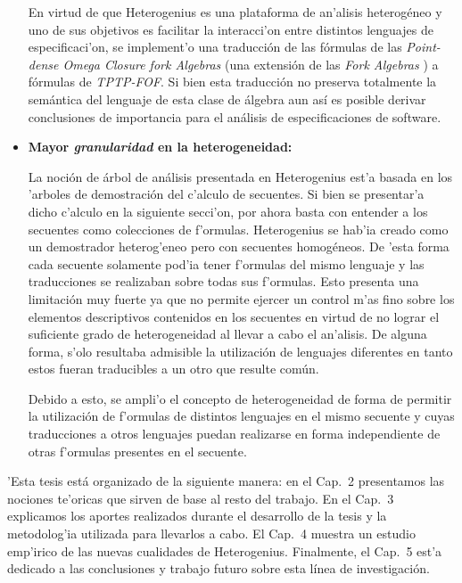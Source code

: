 \begin{itemize}
En virtud de que Heterogenius es una plataforma de an'alisis heterogéneo y uno de sus objetivos es facilitar la interacci'on entre distintos lenguajes de especificaci'on, se implement'o una traducción de las fórmulas de las \emph{Point-dense Omega Closure fork Algebras} \cite{LF06} (una extensión de las \emph{Fork Algebras} \cite{frias02}) a fórmulas de \emph{TPTP-FOF}. Si bien esta traducción no preserva totalmente la semántica del lenguaje de esta clase de álgebra aun así es posible derivar conclusiones de importancia para el análisis de especificaciones de software.


\item \textbf{Mayor \emph{granularidad} en la heterogeneidad:}

La noción de árbol de análisis presentada en Heterogenius est'a basada en los 'arboles de demostración del c'alculo de secuentes.
Si bien se presentar'a dicho c'alculo en la siguiente secci'on, por ahora basta con entender a los secuentes como colecciones de f'ormulas.
Heterogenius se hab'ia creado como un demostrador heterog'eneo pero con secuentes homogéneos. 
De 'esta forma cada secuente solamente pod'ia tener f'ormulas del mismo lenguaje y las traducciones se realizaban sobre todas sus f'ormulas. 
Esto presenta una limitación muy fuerte ya que no permite ejercer un control m'as fino sobre los elementos descriptivos contenidos en los secuentes en virtud de no lograr el suficiente grado de heterogeneidad al llevar a cabo el an'alisis.
De alguna forma, s'olo resultaba admisible la utilización de lenguajes diferentes en tanto estos fueran traducibles a un otro que resulte común.

Debido a esto, se ampli'o el concepto de heterogeneidad de forma de permitir la utilización de f'ormulas de distintos lenguajes en el mismo secuente y cuyas traducciones a otros lenguajes puedan realizarse en forma independiente de otras f'ormulas presentes en el secuente.
\end{itemize}

'Esta tesis está organizado de la siguiente manera: en el Cap.~2 presentamos las nociones te'oricas que sirven de base al resto del trabajo.
En el Cap.~3 explicamos los aportes realizados durante el desarrollo de la tesis y la metodolog'ia utilizada para llevarlos a cabo. El Cap.~4 muestra un estudio emp'irico de las nuevas cualidades de Heterogenius. Finalmente, el Cap.~5 est'a dedicado a las conclusiones y trabajo futuro sobre esta línea de investigación.
